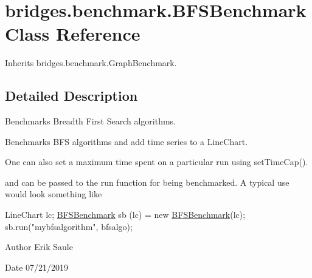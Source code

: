 \hypertarget{classbridges_1_1benchmark_1_1_b_f_s_benchmark}{}\section{bridges.\+benchmark.\+B\+F\+S\+Benchmark Class Reference}
\label{classbridges_1_1benchmark_1_1_b_f_s_benchmark}


Inherits bridges.\+benchmark.\+Graph\+Benchmark.



\subsection{Detailed Description}
Benchmarks Breadth First Search algorithms. 

Benchmarks B\+FS algorithms and add time series to a Line\+Chart.

One can also set a maximum time spent on a particular run using set\+Time\+Cap().

and can be passed to the run function for being benchmarked. A typical use would look something like


\begin{DoxyCode}
LineChart lc;
\hyperlink{classbridges_1_1benchmark_1_1_b_f_s_benchmark_a47647a605d5cd6523e1472191e12ab94}{BFSBenchmark} sb (lc) = \textcolor{keyword}{new} \hyperlink{classbridges_1_1benchmark_1_1_b_f_s_benchmark_a47647a605d5cd6523e1472191e12ab94}{BFSBenchmark}(lc);
sb.run(\textcolor{stringliteral}{"mybfsalgorithm"}, bfsalgo);
\end{DoxyCode}


\begin{DoxyAuthor}{Author}
Erik Saule 
\end{DoxyAuthor}
\begin{DoxyDate}{Date}
07/21/2019 
\end{DoxyDate}
